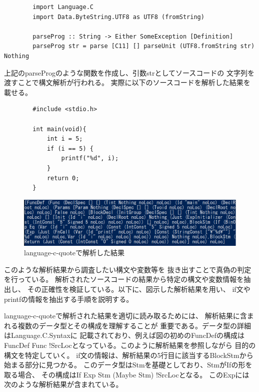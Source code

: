 \documentclass{cssspaper}
\begin{document}
        \begin{lstlisting}
        import Language.C
        import Data.ByteString.UTF8 as UTF8 (fromString)

        parseProg :: String -> Either SomeException [Definition]
        parseProg str = parse [C11] [] parseUnit (UTF8.fromString str) Nothing
        \end{lstlisting}

        上記のparseProgのような関数を作成し、引数strとしてソースコードの
        文字列を渡すことで構文解析が行われる。
        実際に以下のソースコードを解析した結果を載せる。

        \begin{lstlisting}
        #include <stdio.h>
            
        int main(void){
            int i = 5;
            if (i == 5) {
                printf("%d", i);
            }
            return 0;
        }
        \end{lstlisting}

        \begin{figure}[h]
            \centering
            \includegraphics[width=13cm]{lcq1.png}
            \caption{language-c-quoteで解析した結果}
            \label{fig:lcq1}
        \end{figure}

        このような解析結果から調査したい構文や変数等を
        抜き出すことで真偽の判定を行っている。
        解析されたソースコードの結果から特定の構文や変数情報を抽出し、
        その正確性を検証している。以下に、図示した解析結果を用い、
        if文やprintfの情報を抽出する手順を説明する。

        language-c-quoteで解析された結果を適切に読み取るためには、
        解析結果に含まれる複数のデータ型とその構成を理解することが
        重要である。データ型の詳細はLanguage.C.Syntaxに
        記載されており、例えば図の初めのFuncDefの構成は
        FuncDef Func !SrcLocとなっている。このように解析結果を参照しながら
        目的の構文を特定していく。
        if文の情報は、解析結果の5行目に該当するBlockStmから始まる部分に見つかる。
        このデータ型はStmを基礎としており、StmがIfの形を取る場合、
        その構成はIf Exp Stm (Maybe Stm) !SrcLocとなる。
        このExpには次のような解析結果が含まれている。
\end{document}
